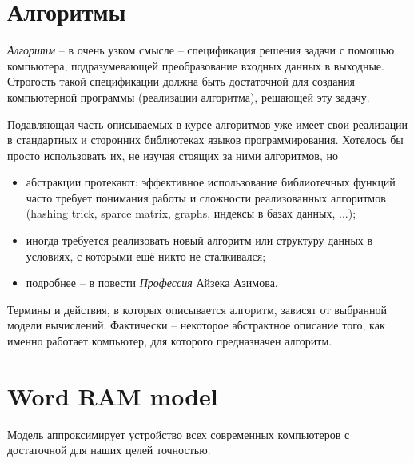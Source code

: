 \documentclass[12pt,a4paper]{report}
\begin{document}

\section{Алгоритмы}

{\em Алгоритм} -- в очень узком смысле -- спецификация решения задачи с помощью компьютера, подразумевающей преобразование входных данных в выходные. Строгость такой спецификации должна быть достаточной для создания компьютерной программы (реализации алгоритма), решающей эту задачу.

Подавляющая часть описываемых в курсе алгоритмов уже имеет свои реализации в стандартных и сторонних библиотеках языков программирования. Хотелось бы просто использовать их, не изучая стоящих за ними алгоритмов, но
\begin{itemize}
	\item абстракции протекают: эффективное использование библиотечных функций часто требует понимания работы и сложности реализованных алгоритмов (hashing trick, sparce matrix, graphs, индексы в базах данных, ...);
	\item иногда требуется реализовать новый алгоритм или структуру данных в условиях, с которыми ещё никто не сталкивался;
	\item подробнее -- в повести {\em Профессия} Айзека Азимова.
\end{itemize}

Термины и действия, в которых описывается алгоритм, зависят от выбранной модели вычислений.
Фактически -- некоторое абстрактное описание того, как именно работает компьютер, для которого предназначен алгоритм.


\section{Word RAM model}

Модель аппроксимирует устройство всех современных компьютеров с достаточной для наших целей точностью.
\end{document}

